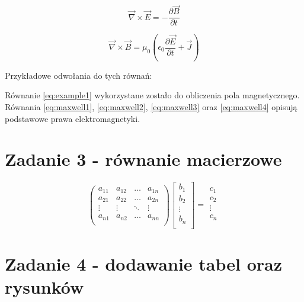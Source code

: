 \documentclass[b5paper,11pt]{article}
\begin{document}
\begin{spacing}{1.5}
    \begin{equation}
        \vec{\nabla} \times \vec{E} = -\frac{\partial \vec{B}}{\partial t} \label{eq:maxwell3}
    \end{equation}

    \begin{equation}
        \vec{\nabla} \times \vec{B} = \mu_0 \left(\epsilon_0 \frac{\partial \vec{E}}{\partial t} + \vec{J}\right) \label{eq:maxwell4}
    \end{equation}

    Przykładowe odwołania do tych równań:

    Równanie \eqref{eq:example1} wykorzystane zostało do obliczenia pola magnetycznego. Równania \eqref{eq:maxwell1}, \eqref{eq:maxwell2}, \eqref{eq:maxwell3} oraz \eqref{eq:maxwell4} opisują podstawowe prawa elektromagnetyki.

    \newpage
    \section{Zadanie 3 - równanie macierzowe}

    \begin{equation}
        \begin{pmatrix}
            a_{11} & a_{12} & \ldots & a_{1n} \\
            a_{21} & a_{22} & \ldots & a_{2n} \\
            \vdots & \vdots & \ddots & \vdots \\
            a_{n1} & a_{n2} & \ldots & a_{nn} \\
        \end{pmatrix}
        \begin{bmatrix}
            b_{1}  \\
            b_{2}  \\
            \vdots \\
            b_{n}  \\
        \end{bmatrix}
        =
        \begin{matrix}
            c_{1}  \\
            c_{2}  \\
            \vdots \\
            c_{n}  \\
        \end{matrix}
    \end{equation}

    \newpage
    \section{Zadanie 4 - dodawanie tabel oraz rysunków}


\end{spacing}
\end{document}
